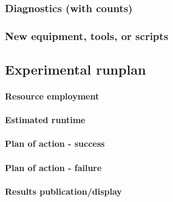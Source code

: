 \documentclass[11pt]{article}
\theoremstyle{plain}
\theoremstyle{remark}
\begin{document}
\subsubsection*{Diagnostics (with counts)}

\subsubsection*{New equipment, tools, or scripts}

\subsection{Experimental runplan} %

\paragraph{Resource employment}

\paragraph{Estimated runtime}

\paragraph{Plan of action - success}

\paragraph{Plan of action - failure}

\paragraph{Results publication/display}

\end{document}
